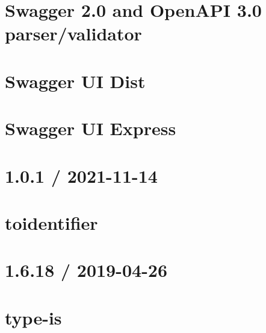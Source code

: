\documentclass[twoside]{book}
\newcommand{\+}{\discretionary{\mbox{\scriptsize$\hookleftarrow$}}{}{}}
\begin{document}
\chapter{Swagger 2.0 and Open\+API 3.0 parser/validator}
\label{md_Backend_nodejs_node_modules_swagger_parser_README}

\chapter{Swagger UI Dist}
\label{md_Backend_nodejs_node_modules_swagger_ui_dist_README}

\chapter{Swagger UI Express}
\label{md_Backend_nodejs_node_modules_swagger_ui_express_README}

\chapter{1.0.1 / 2021-\/11-\/14}
\label{md_Backend_nodejs_node_modules_toidentifier_HISTORY}

\chapter{toidentifier}
\label{md_Backend_nodejs_node_modules_toidentifier_README}

\chapter{1.6.18 / 2019-\/04-\/26}
\label{md_Backend_nodejs_node_modules_type_is_HISTORY}

\chapter{type-\/is}
\label{md_Backend_nodejs_node_modules_type_is_README}

\end{document}
